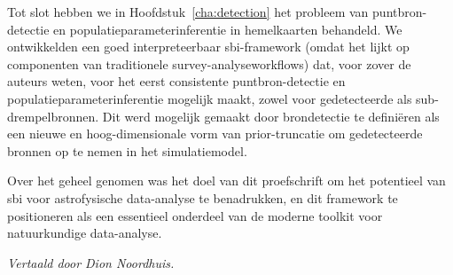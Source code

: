 Tot slot hebben we in Hoofdstuk~\ref{cha:detection} het probleem van puntbron-detectie en populatieparameterinferentie in hemelkaarten behandeld. We ontwikkelden een goed interpreteerbaar \gls*{sbi}-framework (omdat het lijkt op componenten van traditionele survey-analyseworkflows) dat, voor zover de auteurs weten, voor het eerst consistente puntbron-detectie en populatieparameterinferentie mogelijk maakt, zowel voor gedetecteerde als sub-drempelbronnen. Dit werd mogelijk gemaakt door brondetectie te definiëren als een nieuwe en hoog-dimensionale vorm van prior-truncatie om gedetecteerde bronnen op te nemen in het simulatiemodel. 

Over het geheel genomen was het doel van dit proefschrift om het potentieel van \gls*{sbi} voor astrofysische data-analyse te benadrukken, en dit framework te positioneren als een essentieel onderdeel van de moderne toolkit voor natuurkundige data-analyse.  

\textit{Vertaald door Dion Noordhuis.} 